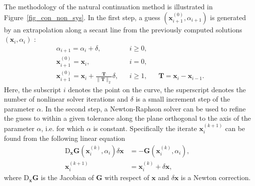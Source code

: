 The methodology of the natural continuation method  is illustrated in Figure~\ref{fig_con_non_sys}. In the first step, a guess $(\mathbf{x}_{i+1}^{(0)},\alpha_{i+1})$ is generated by an extrapolation  along a secant line from the previously computed solutions $(\mathbf{x}_{i},\alpha_{i})$ :
\begin{align}
& \alpha_{i+1} = \alpha_i + \delta,  && i \ge 0,\\
&\mathbf{x}_{i+1}^{(0)} = \mathbf{x}_{i},  && i = 0,     &&\\
&\mathbf{x}_{i+1}^{(0)} = \mathbf{x}_{i} + \frac{\mathbf{T}}{\|\mathbf{T}\|_2} \delta,  && i \geq 1,  && \mathbf{T} = \mathbf{x}_{i}-\mathbf{x}_{i-1}.
\end{align}
Here, the subscript $i$ denotes the point on the curve, the superscript denotes the number of nonlinear solver iterations and $\delta$ is a small increment step of the parameter $\alpha$.
In the second step, a Newton-Raphson solver can be used to refine the guess to within a given tolerance along the plane orthogonal to the axis of the parameter $\alpha$, i.e. for which $\alpha$ is constant. Specifically the iterate $\mathbf{x}_{i}^{(k+1)}$ can be found from the following linear equation
\begin{subequations}\begin{align}
\mathrm{D}_{\mathbf{x}}\mathbf{G}(\mathbf{x}_{i}^{(k)},\alpha_i)\delta \mathbf{x} &= -\mathbf{G}(\mathbf{x}_{i}^{(k)},\alpha_i),\\
\mathbf{x}_{i}^{(k+1)} &=\mathbf{x}_{i}^{(k)} + \delta \mathbf{x},
\end{align}\end{subequations}
where $\mathrm{D}_{\mathbf{x}}\mathbf{G}$ is the Jacobian of $\mathbf{G}$ with respect of $\mathbf{x}$ and $\delta{\mathbf{x}}$ is a Newton correction.
